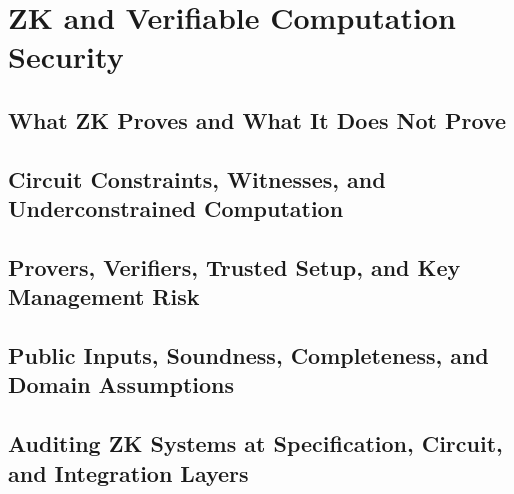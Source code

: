 \chapter{ZK and Verifiable Computation Security}

\section{What ZK Proves and What It Does Not Prove}

\section{Circuit Constraints, Witnesses, and Underconstrained Computation}

\section{Provers, Verifiers, Trusted Setup, and Key Management Risk}

\section{Public Inputs, Soundness, Completeness, and Domain Assumptions}

\section{Auditing ZK Systems at Specification, Circuit, and Integration Layers}
